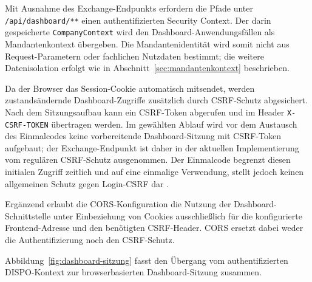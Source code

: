 Mit Ausnahme des Exchange-Endpunkts erfordern die Pfade unter
\texttt{/api/dashboard/**} einen authentifizierten Security Context. Der darin
gespeicherte \texttt{CompanyContext} wird den Dashboard-Anwendungsfällen als
Mandantenkontext übergeben. Die Mandantenidentität wird somit nicht aus
Request-Parametern oder fachlichen Nutzdaten bestimmt; die weitere
Datenisolation erfolgt wie in Abschnitt~\ref{sec:mandantenkontext} beschrieben.

Da der Browser das Session-Cookie automatisch mitsendet, werden
zustandsändernde Dashboard-Zugriffe zusätzlich durch CSRF-Schutz abgesichert.
Nach dem Sitzungsaufbau kann ein CSRF-Token abgerufen und im Header
\texttt{X-CSRF-TOKEN} übertragen werden. Im gewählten Ablauf wird vor dem
Austausch des Einmalcodes keine vorbereitende Dashboard-Sitzung mit CSRF-Token
aufgebaut; der Exchange-Endpunkt ist daher in der aktuellen Implementierung
vom regulären CSRF-Schutz ausgenommen. Der Einmalcode begrenzt diesen initialen
Zugriff zeitlich und auf eine einmalige Verwendung, stellt jedoch keinen
allgemeinen Schutz gegen Login-CSRF dar
\parencite{owaspCsrfPrevention}.

Ergänzend erlaubt die CORS-Konfiguration die Nutzung der
Dashboard-Schnittstelle unter Einbeziehung von Cookies ausschließlich für die
konfigurierte Frontend-Adresse und den benötigten CSRF-Header. CORS ersetzt
dabei weder die Authentifizierung noch den CSRF-Schutz.

Abbildung~\ref{fig:dashboard-sitzung} fasst den Übergang vom authentifizierten
DISPO-Kontext zur browserbasierten Dashboard-Sitzung zusammen.

